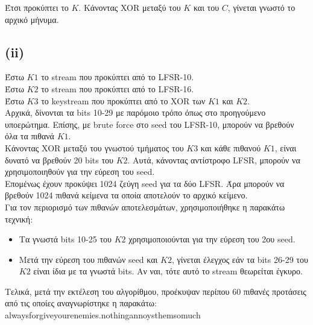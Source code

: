 \documentclass[a4paper, 11pt]{article}
\newcommand{\lt}{\latintext}
\begin{document}
Έτσι προκύπτει το $K$. Κάνοντας {\lt XOR} μεταξύ του $K$ και του $C$, γίνεται γνωστό το αρχικό μήνυμα.

\newpage
\subsection*{{\lt (ii)}}
Έστω $K1$ το {\lt stream} που προκύπτει από το {\lt LFSR-10}.\\
Έστω $K2$ το {\lt stream} που προκύπτει από το {\lt LFSR-16}.\\
Έστω $K3$ το {\lt keystream} που προκύπτει από το {\lt XOR} των $K1$ και $K2$.\\

Αρχικά, δίνονται τα {\lt bits} 10-29 με παρόμοιο τρόπο όπως στο προηγούμενο υποερώτημα. Επίσης, με {\lt brute force} στο {\lt seed} του {\lt LFSR-10}, μπορούν να βρεθούν όλα τα πιθανά $K1$.\\

Κάνοντας {\lt XOR} μεταξύ του γνωστού τμήματος του $K3$ και κάθε πιθανού $K1$, είναι δυνατό να βρεθούν 20 {\lt bits} του $K2$. Αυτά, κάνοντας αντίστροφο {\lt LFSR}, μπορούν να χρησιμοποιηθούν για την εύρεση του {\lt seed}.\\

Επομένως έχουν προκύψει 1024 ζεύγη {\lt seed} για τα δύο {\lt LFSR}. Άρα μπορούν να βρεθούν 1024 πιθανά κείμενα τα οποία αποτελούν το αρχικό κείμενο.\\

Για τον περιορισμό των πιθανών αποτελεσμάτων, χρησιμοποιήθηκε η παρακάτω τεχνική:
\begin{itemize}
	\item Τα γνωστά {\lt bits} 10-25 του $K2$ χρησιμοποιούνται για την εύρεση του 2ου {\lt seed}.
	\item Μετά την εύρεση του πιθανών {\lt seed} και $Κ2$, γίνεται έλεγχος εάν τα {\lt bits} 26-29 του $K2$ είναι ίδια με τα γνωστά {\lt bits}. Αν ναι, τότε αυτό το {\lt stream} θεωρείται έγκυρο.
\end{itemize}

Τελικά, μετά την εκτέλεση του αλγορίθμου, προέκυψαν περίπου 60 πιθανές προτάσεις από τις οποίες αναγνωρίστηκε η παρακάτω:\\
{\lt alwaysforgiveyourenemies.nothingannoysthemsomuch}
\end{document}
